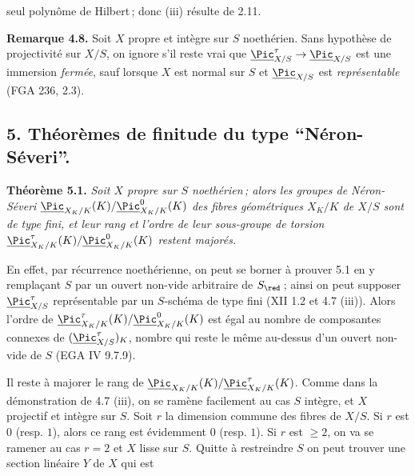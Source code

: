 seul polyn\^ome de Hilbert\,; donc (iii) r\'esulte de 2.11.

\textbf{Remarque 4.8.} Soit \(X\) propre et int\`egre sur \(S\) noeth\'erien. Sans hypoth\`ese de projectivit\'e sur \(X/S\), on ignore s'il reste vrai que \(\underline{\Pic}^\tau_{X/S}\to\underline{\Pic}_{X/S}\) est une immersion \emph{ferm\'ee}, sauf lorsque \(X\) est normal sur \(S\) et \(\underline{\Pic}_{X/S}\) est \emph{repr\'esentable} (FGA 236, 2.3).

\providecommand{\NS}{\operatorname{NS}}
\providecommand{\Picard}{\operatorname{Pic}}
\providecommand{\Et}{\mathrm{et}}
\providecommand{\rk}{\operatorname{rk}}
\providecommand{\im}{\operatorname{Im}}
\providecommand{\HH}{\mathrm H}


\subsection*{5. Th\'eor\`emes de finitude du type ``N\'eron-S\'everi''.}

\textbf{Th\'eor\`eme 5.1.} \emph{Soit \(X\) propre sur \(S\) noeth\'erien\,; alors les groupes de N\'eron-S\'everi \(\underline{\Pic}_{X_K/K}(K)/\underline{\Pic}^0_{X_K/K}(K)\) des fibres g\'eom\'etriques \(X_K/K\) de \(X/S\) sont de type fini, et leur rang et l'ordre de leur sous-groupe de torsion \(\underline{\Pic}^\tau_{X_K/K}(K)/\underline{\Pic}^0_{X_K/K}(K)\) restent major\'es.}

En effet, par r\'ecurrence noeth\'erienne, on peut se borner \`a prouver 5.1 en y rempla\c{c}ant \(S\) par un ouvert non-vide arbitraire de \(S_{\red}\)\,; ainsi on peut supposer \(\underline{\Pic}^\tau_{X/S}\) repr\'esentable par un \(S\)-sch\'ema de type fini (XII 1.2 et 4.7 (iii)). Alors l'ordre de \(\underline{\Pic}^\tau_{X_K/K}(K)/\underline{\Pic}^0_{X_K/K}(K)\) est \'egal au nombre de composantes connexes de \((\underline{\Pic}^\tau_{X/S})_K\), nombre qui reste le m\^eme au-dessus d'un ouvert non-vide de \(S\) (EGA IV 9.7.9).

Il reste \`a majorer le rang de \(\underline{\Pic}_{X_K/K}(K)/\underline{\Pic}^\tau_{X_K/K}(K)\). Comme dans la d\'emonstration de 4.7 (iii), on se ram\`ene facilement au cas \(S\) int\`egre, et \(X\) projectif et int\`egre sur \(S\). Soit \(r\) la dimension commune des fibres de \(X/S\). Si \(r\) est \(0\) (resp. \(1\)), alors ce rang est \'evidemment \(0\) (resp. \(1\)). Si \(r\) est \(\ge2\), on va se ramener au cas \(r=2\) et \(X\) lisse sur \(S\). Quitte \`a restreindre \(S\) on peut trouver une section lin\'eaire \(Y\) de \(X\) qui est
